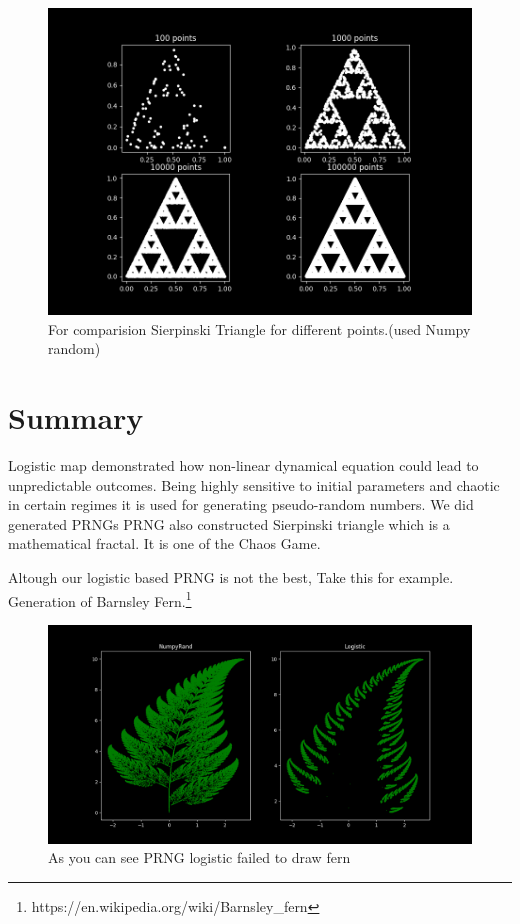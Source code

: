\documentclass{report}
\begin{document}
\begin{figure}[!h]
    \centering
    \includegraphics[scale=.4]{images/numpytri.png}
    \caption{For comparision Sierpinski Triangle for different points.(used Numpy random)}
    \label{fig:my_label12}
\end{figure}


\newpage
\section{Summary}
Logistic map demonstrated how non-linear dynamical equation could lead to unpredictable outcomes. Being highly sensitive to  initial parameters and chaotic in certain regimes it is used for generating pseudo-random numbers. We did generated PRNGs
\newline
PRNG also constructed Sierpinski triangle which is a mathematical fractal. It is one of the Chaos Game.

Altough our logistic based PRNG is not the best, Take this for example. Generation of Barnsley Fern.\footnote[1]{https://en.wikipedia.org/wiki/Barnsley\_fern}
\begin{figure}[!h]
    \centering
    \includegraphics[scale=.3]{images/badfern.png}
    \caption{As you can see PRNG logistic failed to draw fern}
    \label{fig:my_label13}
\end{figure}
\end{document}

